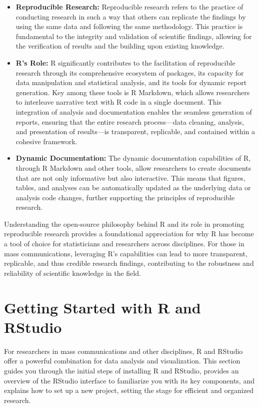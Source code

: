 \documentclass[
]{book}
\begin{document}
\begin{itemize}
\item
  \textbf{Reproducible Research:} Reproducible research refers to the practice of conducting research in such a way that others can replicate the findings by using the same data and following the same methodology. This practice is fundamental to the integrity and validation of scientific findings, allowing for the verification of results and the building upon existing knowledge.
\item
  \textbf{R's Role:} R significantly contributes to the facilitation of reproducible research through its comprehensive ecosystem of packages, its capacity for data manipulation and statistical analysis, and its tools for dynamic report generation. Key among these tools is R Markdown, which allows researchers to interleave narrative text with R code in a single document. This integration of analysis and documentation enables the seamless generation of reports, ensuring that the entire research process---data cleaning, analysis, and presentation of results---is transparent, replicable, and contained within a cohesive framework.
\item
  \textbf{Dynamic Documentation:} The dynamic documentation capabilities of R, through R Markdown and other tools, allow researchers to create documents that are not only informative but also interactive. This means that figures, tables, and analyses can be automatically updated as the underlying data or analysis code changes, further supporting the principles of reproducible research.
\end{itemize}

Understanding the open-source philosophy behind R and its role in promoting reproducible research provides a foundational appreciation for why R has become a tool of choice for statisticians and researchers across disciplines. For those in mass communications, leveraging R's capabilities can lead to more transparent, replicable, and thus credible research findings, contributing to the robustness and reliability of scientific knowledge in the field.

\section{Getting Started with R and RStudio}\label{getting-started-with-r-and-rstudio}

For researchers in mass communications and other disciplines, R and RStudio offer a powerful combination for data analysis and visualization. This section guides you through the initial steps of installing R and RStudio, provides an overview of the RStudio interface to familiarize you with its key components, and explains how to set up a new project, setting the stage for efficient and organized research.
\end{document}

